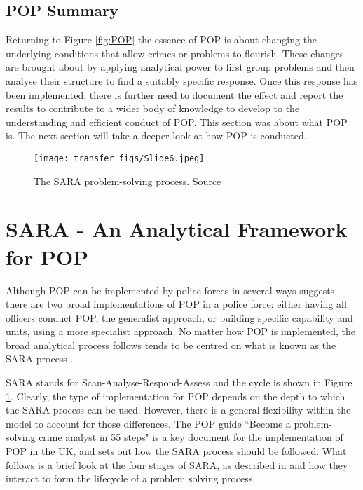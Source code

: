 \subsection{POP Summary} Returning to Figure \ref{fig:POP} the essence of POP is about changing the underlying conditions that allow crimes or problems to flourish. These changes are brought about by applying analytical power to first group problems and then analyse their structure to find a suitably specific response. Once this response has been implemented, there is further need to document the effect and report the results to contribute to a wider body of knowledge to develop to the understanding and efficient conduct of POP. This section was about what POP is. The next section will take a deeper look at how POP is conducted.

\begin{figure}
  \texttt{[image: transfer\_figs/Slide6.jpeg]}
  \caption[The SARA problem-solving process.]{The SARA problem-solving process. Source \textcite{clarke2003becoming}}
  \label{fig:SARA}
\end{figure}

\section{SARA  - An Analytical Framework for POP} Although POP can be implemented by police forces in several ways \textcite{scott2012implementing} suggests there are two broad implementations of POP in a police force: either having all officers conduct POP, the generalist approach, or building specific capability and units, using a more specialist approach. No matter how POP is implemented, the broad analytical process follows tends to be centred on what is known as the SARA process  \parencite{POPUCL}. 

SARA stands for Scan-Analyse-Respond-Assess and the cycle is shown in Figure \ref{fig:SARA}.  Clearly, the type of implementation for POP depends on the depth to which the SARA process can be used. However, there is a general flexibility within the model to account for those differences. The POP guide ``Become a problem-solving crime analyst in 55 steps"  \parencite{clarke2003becoming} is a key document for the implementation of POP in the UK, and sets out how the SARA process should be followed. What follows is a brief look at the four stages of SARA, as described in  and how they interact to form the lifecycle of a problem solving process.


